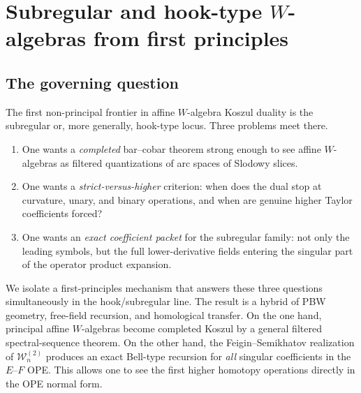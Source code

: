 
\chapter{Subregular and hook-type \texorpdfstring{$W$}{W}-algebras from first principles}
\label{chap:subregular-hook-frontier}

\section{The governing question}

The first non-principal frontier in affine $W$-algebra Koszul duality is the
subregular or, more generally, hook-type locus.  Three problems meet there.

\begin{enumerate}[label=(\roman*)]
\item One wants a \emph{completed} bar--cobar theorem strong enough to see
  affine $W$-algebras as filtered quantizations of arc spaces of Slodowy slices.
\item One wants a \emph{strict-versus-higher} criterion: when does the dual stop
  at curvature, unary, and binary operations, and when are genuine higher
  Taylor coefficients forced?
\item One wants an \emph{exact coefficient packet} for the subregular family:
  not only the leading symbols, but the full lower-derivative fields entering
  the singular part of the operator product expansion.
\end{enumerate}

We isolate a first-principles mechanism that
answers these three questions simultaneously in the hook/subregular line.  The
result is a hybrid of PBW geometry, free-field recursion, and homological
transfer.  On the one hand, principal affine $W$-algebras become completed
Koszul by a general filtered spectral-sequence theorem.  On the other hand, the
Feigin--Semikhatov realization of $\mathcal W_n^{(2)}$ produces an exact
Bell-type recursion for \emph{all} singular coefficients in the $E$--$F$ OPE.
This allows one to see the first higher homotopy operations directly in the
OPE normal form.


